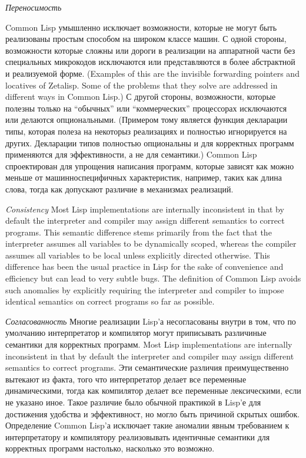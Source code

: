 \begin{flushdesc}
\item[{\it Переносимость}]

\begingroup{}
Common Lisp умышленно исключает возможности, которые не могут быть
реализованы простым способом на широком классе машин. С одной
стороны, возможности которые сложны или дороги в реализации на
аппаратной части без специальных микрокодов исключаются или
представляются в более абстрактной и реализуемой форме.
(Examples of this are the invisible forwarding pointers
and locatives of Zetalisp.  Some of the problems that they solve
are addressed in different ways in Common Lisp.)
С другой стороны, возможности, которые полезны только на
``обычных'' или ``коммерческих'' процессорах исключаются или
делаются опциональными. (Примером тому является функция декларации
типы, которая полеза на некоторыз реализациях и полностью
игнорируется на других. Декларации типов полностью опциональны и
для корректных программ применяются для эффективности, а не для семантики.)
Common Lisp спроектирован для упрощения написания программ,
которые зависят как можно меньше от машинноспецифичных
характеристик, например, таких как длина слова, тогда как
допускают различие в механизмах реализаций.
\par\endgroup

\item[{\it Consistency}]
Most Lisp implementations are internally inconsistent
in that by default the interpreter and compiler may assign different
semantics to correct programs.
This semantic difference stems primarily from the fact
that the interpreter assumes all variables to be dynamically scoped,
whereas the compiler assumes all variables to be local unless explicitly
directed otherwise.  This difference has been the usual practice in Lisp
for the sake of convenience
and efficiency but can lead to very subtle bugs.  The definition of
Common Lisp avoids such anomalies by explicitly requiring the interpreter
and compiler to impose identical semantics on correct programs
so far as possible.

\item[{\it Согласованность}]
Многие реализации Lisp'а несогласованы внутри в том, что по
умолчанию интерпретатор и компилятор могут приписывать различиные
семантики для корректных программ.
Most Lisp implementations are internally inconsistent
in that by default the interpreter and compiler may assign different
semantics to correct programs.
Эти семантические различия преимущественно вытекают из факта, того
что интерпретатор делает все переменные динамическими, тогда как
компилятор делает все переменные лексическими, если не указано
иное. Такое различие было обычной практикой в Lisp'е для
достижения удобства и эффективност, но могло быть причиной скрытых
ошибок. Определение Common Lisp'а исключает такие аномалии явным
требованием к интерпретатору и компилятору реализовывать
идентичные семантики для корректных программ настолько, насколько
это возможно.


\end{flushdesc}
